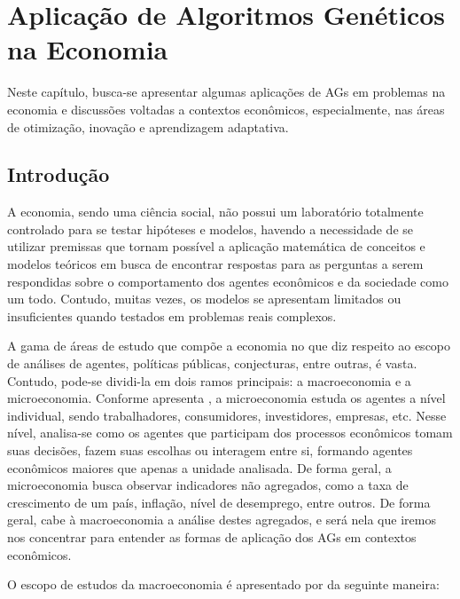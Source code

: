 \chapter{Aplicação de Algoritmos Genéticos na Economia}

Neste capítulo, busca-se apresentar algumas aplicações de AGs em problemas na economia e discussões voltadas a contextos econômicos, especialmente, nas áreas de otimização, inovação e aprendizagem adaptativa.

\section{Introdução}

A economia, sendo uma ciência social, não possui um laboratório totalmente controlado para se testar hipóteses e modelos, havendo a necessidade de se utilizar premissas que tornam possível a aplicação matemática de conceitos e modelos teóricos em busca de encontrar respostas para as perguntas a serem respondidas sobre o comportamento dos agentes econômicos e da sociedade como um todo. Contudo, muitas vezes, os modelos se apresentam limitados ou insuficientes quando testados em problemas reais complexos.

A gama de áreas de estudo que compõe a economia  no que diz respeito ao escopo de análises de agentes, políticas públicas, conjecturas, entre outras, é vasta. Contudo, pode-se dividi-la em dois ramos principais: a macroeconomia e a microeconomia. Conforme apresenta \citet[pg.3]{pindyck_microeconomia_2013}, a microeconomia estuda os agentes a nível individual, sendo trabalhadores, consumidores, investidores, empresas, etc. Nesse nível, analisa-se como os agentes que participam dos processos econômicos tomam suas decisões, fazem suas escolhas ou interagem entre si, formando agentes econômicos maiores que apenas a unidade analisada. De forma geral, a microeconomia busca observar indicadores não agregados, como a taxa de crescimento de um país, inflação, nível de desemprego, entre outros. De forma geral, cabe à macroeconomia a análise destes agregados, e será nela que iremos nos concentrar para entender as formas de aplicação dos AGs em contextos econômicos.

O escopo de estudos da macroeconomia é apresentado por \citeauthor*{snowdon_modern_2005} da seguinte maneira:

